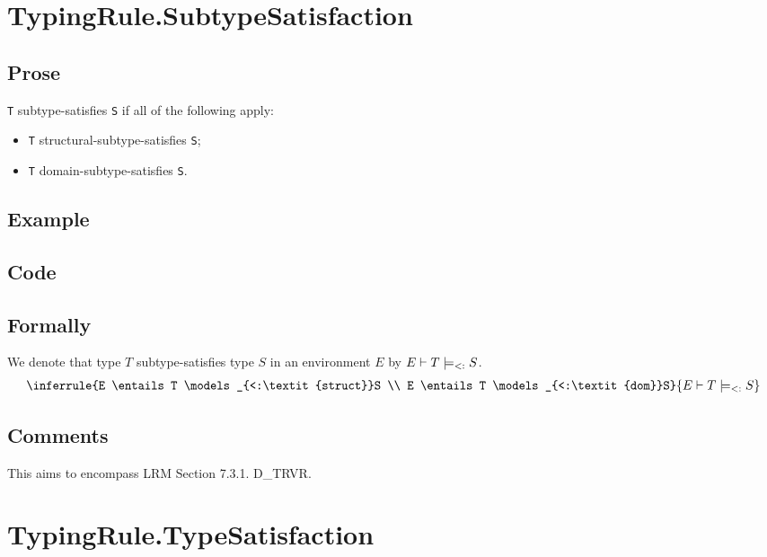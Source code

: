 \documentclass{book}
\newcommand\structsubtypesat[0]{\models_{<:\textit{struct}}}
\newcommand\domsubtypesat[0]{\models_{<:\textit{dom}}}
\newcommand\subtypesat[0]{\models_{<:}}
\begin{document}
\section{TypingRule.SubtypeSatisfaction}

  \subsection{Prose}
    \texttt{T} subtype-satisfies \texttt{S} if all of the following apply:
    \begin{itemize}
    \item \texttt{T} structural-subtype-satisfies \texttt{S};
    \item \texttt{T} domain-subtype-satisfies \texttt{S}.
    \end{itemize} 

  \subsection{Example}

  \subsection{Code}

\begin{emptyformal}
    \subsection{Formally}
We denote that type $T$ subtype-satisfies type $S$ in an environment $E$ by $E \entails T \subtypesat S$.
\[
\begin{array}{c}
\inferrule{E \entails T \structsubtypesat S \\ E \entails T \domsubtypesat S}
{E \entails T \subtypesat S}
\end{array}
\]
\end{emptyformal}

\subsection{Comments}
    This aims to encompass LRM Section 7.3.1. D\_TRVR.

\section{TypingRule.TypeSatisfaction \label{sec:TypingRule.TypeSatisfaction}}
\end{document}

